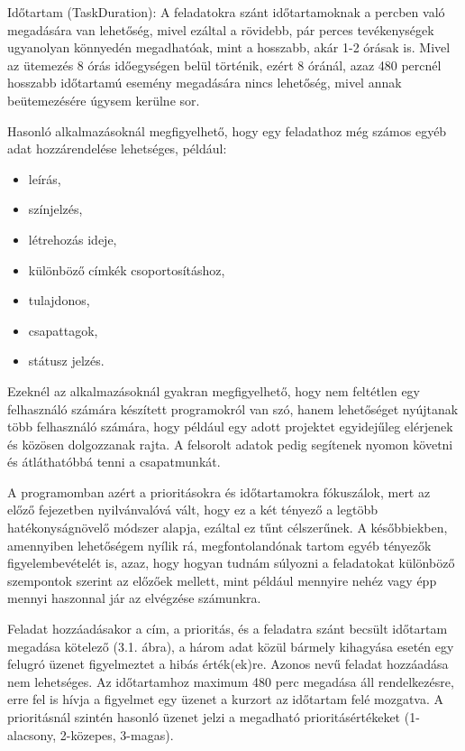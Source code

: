 Időtartam (TaskDuration): A feladatokra szánt időtartamoknak a percben való megadására van lehetőség, mivel ezáltal a rövidebb, pár perces tevékenységek ugyanolyan könnyedén megadhatóak, mint a hosszabb, akár 1-2 órásak is. Mivel az ütemezés 8 órás időegységen belül történik, ezért 8 óránál, azaz 480 percnél hosszabb időtartamú esemény megadására nincs lehetőség, mivel annak beütemezésére úgysem kerülne sor.

Hasonló alkalmazásoknál megfigyelhető, hogy egy feladathoz még számos egyéb adat hozzárendelése lehetséges, például:

\begin{itemize}
	\item leírás,
	\item színjelzés,
	\item létrehozás ideje,
	\item különböző címkék csoportosításhoz,
	\item tulajdonos,
	\item csapattagok,
	\item státusz jelzés.
\end{itemize}

Ezeknél az alkalmazásoknál gyakran megfigyelhető, hogy nem feltétlen egy felhasználó számára készített programokról van szó, hanem lehetőséget nyújtanak több felhasználó számára, hogy például egy adott projektet egyidejűleg elérjenek és közösen dolgozzanak rajta. A felsorolt adatok pedig segítenek nyomon követni és átláthatóbbá tenni a csapatmunkát.

A programomban azért a prioritásokra és időtartamokra fókuszálok, mert az előző fejezetben nyilvánvalóvá vált, hogy ez a két tényező a legtöbb hatékonyságnövelő módszer alapja, ezáltal ez tűnt célszerűnek. A későbbiekben, amennyiben lehetőségem nyílik rá, megfontolandónak tartom egyéb tényezők figyelembevételét is, azaz, hogy hogyan tudnám súlyozni a feladatokat különböző szempontok szerint az előzőek mellett, mint például mennyire nehéz vagy épp mennyi haszonnal jár az elvégzése számunkra. 


Feladat hozzáadásakor a cím, a prioritás, és a feladatra szánt becsült időtartam megadása kötelező (3.1. ábra), a három adat közül bármely kihagyása esetén egy felugró üzenet figyelmeztet a hibás érték(ek)re. Azonos nevű feladat hozzáadása nem lehetséges. Az időtartamhoz maximum 480 perc megadása áll rendelkezésre, erre fel is hívja a figyelmet egy üzenet a kurzort az időtartam felé mozgatva. A prioritásnál szintén hasonló üzenet jelzi a megadható prioritásértékeket (1-alacsony, 2-közepes, 3-magas).

